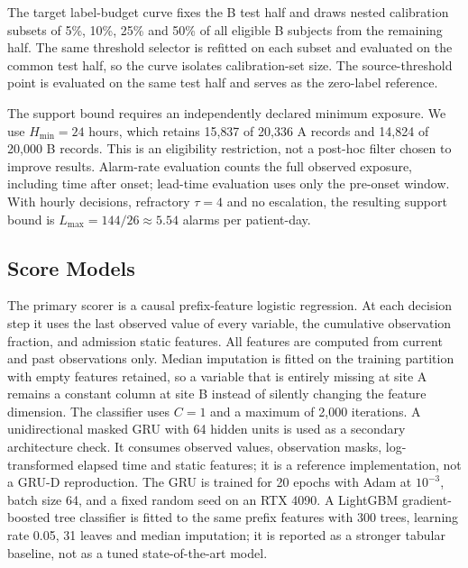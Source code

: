 The target label-budget curve fixes the B test half and draws nested calibration subsets of 5\%, 10\%, 25\% and 50\% of all eligible B subjects from the remaining half. The same threshold selector is refitted on each subset and evaluated on the common test half, so the curve isolates calibration-set size. The source-threshold point is evaluated on the same test half and serves as the zero-label reference.

The support bound requires an independently declared minimum exposure. We use $H_{\min}=24$ hours, which retains 15{,}837 of 20{,}336 A records and 14{,}824 of 20{,}000 B records. This is an eligibility restriction, not a post-hoc filter chosen to improve results. Alarm-rate evaluation counts the full observed exposure, including time after onset; lead-time evaluation uses only the pre-onset window. With hourly decisions, refractory $\tau=4$ and no escalation, the resulting support bound is $L_{\max}=144/26\approx5.54$ alarms per patient-day.

\subsection{Score Models}

The primary scorer is a causal prefix-feature logistic regression. At each decision step it uses the last observed value of every variable, the cumulative observation fraction, and admission static features. All features are computed from current and past observations only. Median imputation is fitted on the training partition with empty features retained, so a variable that is entirely missing at site A remains a constant column at site B instead of silently changing the feature dimension. The classifier uses $C=1$ and a maximum of 2{,}000 iterations. A unidirectional masked GRU with 64 hidden units is used as a secondary architecture check. It consumes observed values, observation masks, log-transformed elapsed time and static features; it is a reference implementation, not a GRU-D reproduction. The GRU is trained for 20 epochs with Adam at $10^{-3}$, batch size 64, and a fixed random seed on an RTX 4090. A LightGBM gradient-boosted tree classifier is fitted to the same prefix features with 300 trees, learning rate 0.05, 31 leaves and median imputation; it is reported as a stronger tabular baseline, not as a tuned state-of-the-art model.


